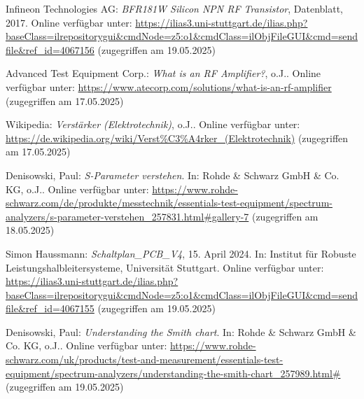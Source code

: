 \begin{thebibliography}{1}
Infineon Technologies AG: \emph{BFR181W Silicon NPN RF Transistor}, Datenblatt, 2017. Online verfügbar unter: \url{https://ilias3.uni-stuttgart.de/ilias.php?baseClass=ilrepositorygui&cmdNode=z5:o1&cmdClass=ilObjFileGUI&cmd=sendfile&ref_id=4067156} (zugegriffen am 19.05.2025)

Advanced Test Equipment Corp.: \emph{What is an RF Amplifier?}, o.J.. Online verfügbar unter: \url{https://www.atecorp.com/solutions/what-is-an-rf-amplifier} (zugegriffen am 17.05.2025)

Wikipedia: \emph{Verstärker (Elektrotechnik)}, o.J.. Online verfügbar unter: \url{https://de.wikipedia.org/wiki/Verst%C3%A4rker_(Elektrotechnik)} (zugegriffen am 17.05.2025)

Denisowski, Paul: \emph{S-Parameter verstehen}. In: Rohde \& Schwarz GmbH \& Co. KG, o.J.. Online verfügbar unter: \url{https://www.rohde-schwarz.com/de/produkte/messtechnik/essentials-test-equipment/spectrum-analyzers/s-parameter-verstehen_257831.html#gallery-7} (zugegriffen am 18.05.2025)

Simon Haussmann: \emph{Schaltplan\_PCB\_V4}, 15. April 2024. In: Institut für Robuste Leistungshalbleitersysteme, Universität Stuttgart. Online verfügbar unter: \url{https://ilias3.uni-stuttgart.de/ilias.php?baseClass=ilrepositorygui&cmdNode=z5:o1&cmdClass=ilObjFileGUI&cmd=sendfile&ref_id=4067155} (zugegriffen am 19.05.2025)


Denisowski, Paul: \emph{Understanding the Smith chart}. In: Rohde \& Schwarz GmbH \& Co. KG, o.J.. Online verfügbar unter: \url{https://www.rohde-schwarz.com/uk/products/test-and-measurement/essentials-test-equipment/spectrum-analyzers/understanding-the-smith-chart_257989.html#} (zugegriffen am 19.05.2025)
\end{thebibliography}


%
\clearpage
